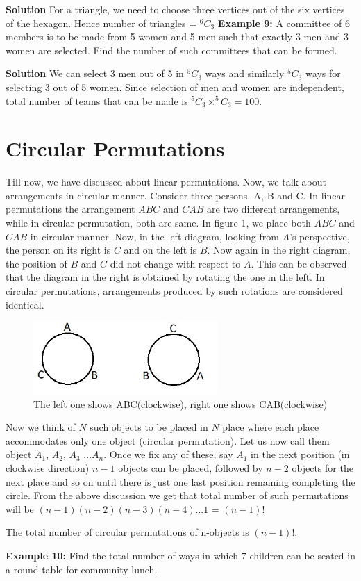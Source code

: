 \documentclass[12pt, a4paper]{article}
\begin{document}
\textbf{Solution} For a triangle, we need to choose three vertices out of the six vertices of the hexagon. Hence number of triangles = $^6C_3$ \newline
\textbf{Example 9:} A committee of 6 members is to be made from 5 women and 5 men such that exactly 3 men and 3 women are selected. Find the number of such committees that can be formed.

\textbf{Solution} We can select 3 men out of 5 in $^5C_3$ ways and similarly $^5C_3$ ways for selecting 3 out of 5 women. Since selection of men and women are independent, total number of teams that can be made is $^{5}C_{3} \times ^{5}C_{3} = 100$.
\section{Circular Permutations}
Till now, we have discussed about linear permutations. Now, we talk about arrangements in circular manner. Consider three persons- A, B and C. In linear permutations the arrangement $ABC$ and $CAB$ are two different arrangements, while in circular permutation, both are same. In figure 1, we place both $ABC$ and $CAB$ in circular manner. Now, in the left diagram, looking from $A$'s perspective, the person on its right is $C$ and on the left is $B$. Now again in the right diagram, the position of $B$ and $C$ did not change with respect to $A$. This can be observed that the diagram in the right is obtained by rotating the one in the left. In circular permutations, arrangements produced by such rotations are considered identical.
\begin{figure}
    \centering
    \includegraphics[width=7cm]{PnCcircularpermu.jpg}
    \caption{The left one shows ABC(clockwise), right one shows CAB(clockwise)}
    \label{fig:my_label}
\end{figure} \newline
Now we think of $N$ such objects to be placed in $N$ place where each place accommodates only one object (circular permutation). Let us now call them object $A_{1}$, $A_{2}$, $A_3$ ...$A_n$. Once we fix any of these, say $A_1$ in the next position (in clockwise direction) $n-1$ objects can be placed, followed by $n-2$ objects for the next place and so on until there is just one last position remaining completing the circle. From the above discussion we get that total number of such permutations will be $(n-1)(n-2)(n-3)(n-4)$...$1$ = $(n-1)!$ 
\begin{tcolorbox}[colback=TealBlue!10!White,colframe=TealBlue!50!black]
The total number of circular permutations of n-objects is $(n-1)!$.
\end{tcolorbox}
\textbf{Example 10:} Find the total number of ways in which 7 children can be seated in a round table for community lunch.
\end{document}
